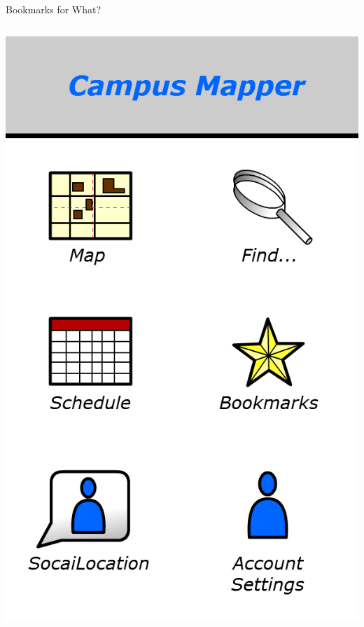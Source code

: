 \documentclass{beamer}
\begin{document}
\begin{frame}{Bookmarks for What?}
    \begin{columns}[c]
        \center\includegraphics[height=0.5 \textheight]{digital/dashboard.png}

\end{columns}
\end{frame}
\end{document}
